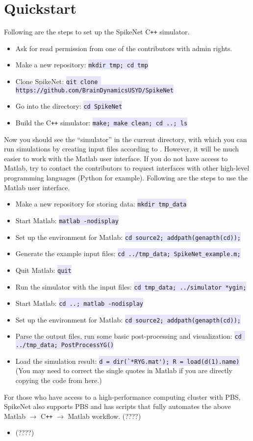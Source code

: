 \documentclass{article}
\newcommand{\mylstinline}[1] {\colorbox{Lavender}{\lstinline[basicstyle=\ttfamily\footnotesize\color{Black}]|#1|} }
\begin{document}
\section{Quickstart}
Following are the steps to set up the SpikeNet C\texttt{++} simulator.
\begin{itemize}
\item Ask for read permission from one of the contributors with admin rights.
\item Make a new repository: \mylstinline{mkdir tmp; cd tmp}
\item Clone SpikeNet: \mylstinline{git clone https://github.com/BrainDynamicsUSYD/SpikeNet}
\item Go into the directory: \mylstinline{cd SpikeNet}
\item Build the C\texttt{++} simulator:  \mylstinline{make; make clean; cd ..; ls}
\end{itemize}
Now you should see the ``simulator'' in the current directory, with which you can run simulations by creating input files according to .
However, it will be much easier to work with the Matlab user interface.
If you do not have access to Matlab, try to contact the contributors to request interfaces with other high-level programming languages (Python for example).
Following are the steps to use the Matlab user interface.
\begin{itemize}
\item Make a new repository for storing data: \mylstinline{mkdir tmp_data}
\item Start Matlab: \mylstinline{matlab -nodisplay}
\item Set up the environment for Matlab: \mylstinline{cd source2; addpath(genapth(cd));}
\item Generate the example input files: \mylstinline{cd ../tmp_data; SpikeNet_example.m;}
\item Quit Matlab: \mylstinline{quit}
\item Run the simulator with the input files: \mylstinline{cd tmp_data; ../simulator *ygin;}
\item Start Matlab: \mylstinline{cd ..; matlab -nodisplay}
\item Set up the environment for Matlab: \mylstinline{cd source2; addpath(genapth(cd));}
\item Parse the output files, run some basic post-processing and visualization: \mylstinline{cd ../tmp_data; PostProcessYG()}
\item Load the simulation result: \mylstinline{d = dir(`*RYG.mat'); R = load(d(1).name)} (You may need to correct the single quotes in Matlab if you are directly copying the code from here.)
\end{itemize}
For those who have access to a high-performance computing cluster with PBS, SpikeNet also supports PBS and has scripts that fully automates the above Matlab $\rightarrow$  C\texttt{++}  $\rightarrow$ Matlab workflow. (????)
\begin{itemize}
\item (????)
\end{itemize}
\end{document}
